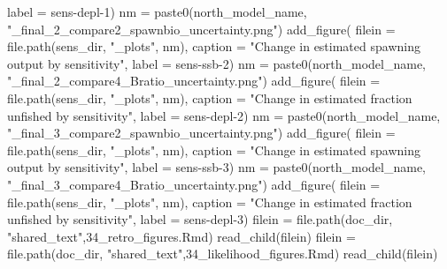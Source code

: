 \documentclass[
  letterpaper,
]{article}
\newenvironment{Shaded}{\begin{snugshade}}{\end{snugshade}}
\newcommand{\AttributeTok}[1]{\textcolor[rgb]{0.77,0.63,0.00}{#1}}
\newcommand{\FunctionTok}[1]{\textcolor[rgb]{0.00,0.00,0.00}{#1}}
\newcommand{\NormalTok}[1]{#1}
\newcommand{\OtherTok}[1]{\textcolor[rgb]{0.56,0.35,0.01}{#1}}
\newcommand{\StringTok}[1]{\textcolor[rgb]{0.31,0.60,0.02}{#1}}
\begin{document}
\begin{Shaded}
\begin{Highlighting}[]
\AttributeTok{label =} \StringTok{\textquotesingle{}sens{-}depl{-}1\textquotesingle{}}\NormalTok{)}
\NormalTok{nm }\OtherTok{=} \FunctionTok{paste0}\NormalTok{(north\_model\_name, }\StringTok{"\_final\_2\_compare2\_spawnbio\_uncertainty.png"}\NormalTok{)}
\FunctionTok{add\_figure}\NormalTok{(}
\AttributeTok{filein =} \FunctionTok{file.path}\NormalTok{(sens\_dir, }\StringTok{"\_plots"}\NormalTok{, nm),}
\AttributeTok{caption =} \StringTok{"Change in estimated spawning output by sensitivity"}\NormalTok{,}
\AttributeTok{label =} \StringTok{\textquotesingle{}sens{-}ssb{-}2\textquotesingle{}}\NormalTok{)}
\NormalTok{nm }\OtherTok{=} \FunctionTok{paste0}\NormalTok{(north\_model\_name, }\StringTok{"\_final\_2\_compare4\_Bratio\_uncertainty.png"}\NormalTok{)}
\FunctionTok{add\_figure}\NormalTok{(}
\AttributeTok{filein =} \FunctionTok{file.path}\NormalTok{(sens\_dir, }\StringTok{"\_plots"}\NormalTok{, nm),}
\AttributeTok{caption =} \StringTok{"Change in estimated fraction unfished by sensitivity"}\NormalTok{,}
\AttributeTok{label =} \StringTok{\textquotesingle{}sens{-}depl{-}2\textquotesingle{}}\NormalTok{)}
\NormalTok{nm }\OtherTok{=} \FunctionTok{paste0}\NormalTok{(north\_model\_name, }\StringTok{"\_final\_3\_compare2\_spawnbio\_uncertainty.png"}\NormalTok{)}
\FunctionTok{add\_figure}\NormalTok{(}
\AttributeTok{filein =} \FunctionTok{file.path}\NormalTok{(sens\_dir, }\StringTok{"\_plots"}\NormalTok{, nm),}
\AttributeTok{caption =} \StringTok{"Change in estimated spawning output by sensitivity"}\NormalTok{,}
\AttributeTok{label =} \StringTok{\textquotesingle{}sens{-}ssb{-}3\textquotesingle{}}\NormalTok{)}
\NormalTok{nm }\OtherTok{=} \FunctionTok{paste0}\NormalTok{(north\_model\_name, }\StringTok{"\_final\_3\_compare4\_Bratio\_uncertainty.png"}\NormalTok{)}
\FunctionTok{add\_figure}\NormalTok{(}
\AttributeTok{filein =} \FunctionTok{file.path}\NormalTok{(sens\_dir, }\StringTok{"\_plots"}\NormalTok{, nm),}
\AttributeTok{caption =} \StringTok{"Change in estimated fraction unfished by sensitivity"}\NormalTok{,}
\AttributeTok{label =} \StringTok{\textquotesingle{}sens{-}depl{-}3\textquotesingle{}}\NormalTok{)}
\NormalTok{filein }\OtherTok{=} \FunctionTok{file.path}\NormalTok{(doc\_dir, }\StringTok{"shared\_text"}\NormalTok{,}\StringTok{\textquotesingle{}34\_retro\_figures.Rmd\textquotesingle{}}\NormalTok{)}
\FunctionTok{read\_child}\NormalTok{(filein)}
\NormalTok{filein }\OtherTok{=} \FunctionTok{file.path}\NormalTok{(doc\_dir, }\StringTok{"shared\_text"}\NormalTok{,}\StringTok{\textquotesingle{}34\_likelihood\_figures.Rmd\textquotesingle{}}\NormalTok{)}
\FunctionTok{read\_child}\NormalTok{(filein)}

\end{Highlighting}
\end{Shaded}
\end{document}
